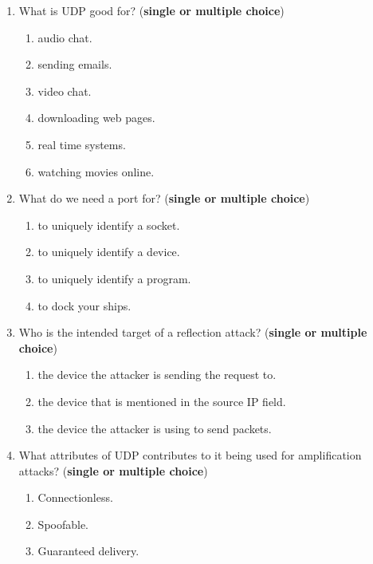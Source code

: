 \documentclass{article}
\newcommand{\incorrectOption}{\item[\textbf{\Circle}]}
\begin{document}
\begin{enumerate}[leftmargin=*, label=\textbf{Q\arabic*}, itemsep=-5pt]
\item What is UDP good for? 
  (\textbf{single or multiple choice})
  \begin{enumerate}[itemsep=-3.5pt, label={}]
    \incorrectOption audio chat. 
    \incorrectOption sending emails. 
    \incorrectOption video chat. 
    \incorrectOption downloading web pages. 
    \incorrectOption real time systems. 
    \incorrectOption watching movies online. 
   \end{enumerate}   
\item What do we need a port for? 
  (\textbf{single or multiple choice})
  \begin{enumerate}[itemsep=-3.5pt, label={}]
    \incorrectOption to uniquely identify a socket.
    \incorrectOption to uniquely identify a device.
    \incorrectOption to uniquely identify a program. 
    \incorrectOption to dock your ships.
   \end{enumerate}   
\item Who is the intended target of a reflection attack?
  (\textbf{single or multiple choice})
  \begin{enumerate}[itemsep=-3.5pt, label={}]
    \incorrectOption the device the attacker is sending the request to.
    \incorrectOption the device that is mentioned in the source IP field.
    \incorrectOption the device the attacker is using to send packets.
   \end{enumerate}   
\item What attributes of UDP contributes to it being used for
  amplification attacks?  
  (\textbf{single or multiple choice})
  \begin{enumerate}[itemsep=-3.5pt, label={}]
    \incorrectOption Connectionless.
    \incorrectOption Spoofable.
    \incorrectOption Guaranteed delivery.
   \end{enumerate}   
\end{enumerate}
\end{document}
